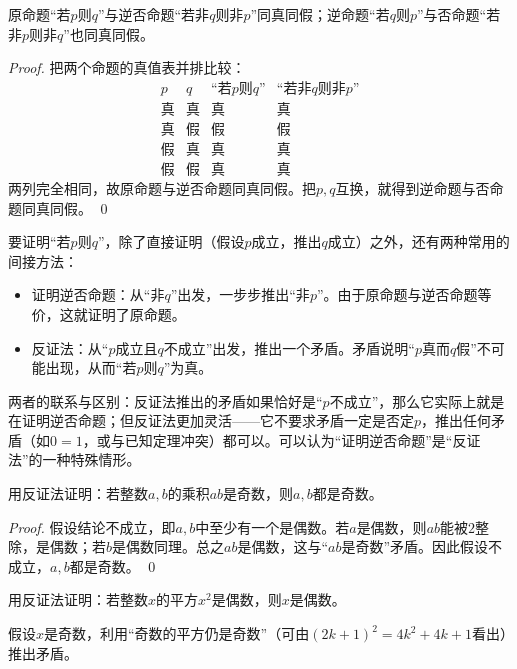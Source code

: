 \begin{theorem}[原命题与逆否命题等价]
原命题“若$p$则$q$”与逆否命题“若非$q$则非$p$”同真同假；逆命题“若$q$则$p$”与否命题“若非$p$则非$q$”也同真同假。
\end{theorem}
\begin{proof}
把两个命题的真值表并排比较：
\[
\begin{array}{c|c||c|c}
p & q & \text{“若}p\text{则}q\text{”} & \text{“若非}q\text{则非}p\text{”}\\\hline
\text{真} & \text{真} & \text{真} & \text{真}\\
\text{真} & \text{假} & \text{假} & \text{假}\\
\text{假} & \text{真} & \text{真} & \text{真}\\
\text{假} & \text{假} & \text{真} & \text{真}
\end{array}
\]
两列完全相同，故原命题与逆否命题同真同假。把$p,q$互换，就得到逆命题与否命题同真同假。
\qed
\end{proof}

\begin{zhu}
要证明“若$p$则$q$”，除了直接证明（假设$p$成立，推出$q$成立）之外，还有两种常用的间接方法：
\begin{itemize}
    \item 证明逆否命题：从“非$q$”出发，一步步推出“非$p$”。由于原命题与逆否命题等价，这就证明了原命题。
    \item 反证法：从“$p$成立且$q$不成立”出发，推出一个矛盾。矛盾说明“$p$真而$q$假”不可能出现，从而“若$p$则$q$”为真。
\end{itemize}
两者的联系与区别：反证法推出的矛盾如果恰好是“$p$不成立”，那么它实际上就是在证明逆否命题；但反证法更加灵活——它不要求矛盾一定是否定$p$，推出任何矛盾（如$0=1$，或与已知定理冲突）都可以。可以认为“证明逆否命题”是“反证法”的一种特殊情形。
\end{zhu}

\begin{example}
用反证法证明：若整数$a,b$的乘积$ab$是奇数，则$a,b$都是奇数。
\end{example}
\begin{proof}
假设结论不成立，即$a,b$中至少有一个是偶数。若$a$是偶数，则$ab$能被$2$整除，是偶数；若$b$是偶数同理。总之$ab$是偶数，这与“$ab$是奇数”矛盾。因此假设不成立，$a,b$都是奇数。
\qed
\end{proof}

\begin{exercise}
用反证法证明：若整数$x$的平方$x^2$是偶数，则$x$是偶数。
\end{exercise}
\begin{hint}
假设$x$是奇数，利用“奇数的平方仍是奇数”（可由$(2k+1)^2=4k^2+4k+1$看出）推出矛盾。
\end{hint}

